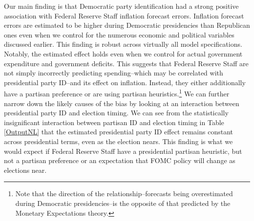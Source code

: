 \documentclass[a4paper]{article}\usepackage[]{graphicx}\usepackage[]{color}
\begin{document}
Our main finding is that Democratic party identification had a strong positive association with Federal Reserve Staff inflation forecast errors. Inflation forecast errors are estimated to be higher during Democratic presidencies than Republican ones even when we control for the numerous economic and political variables discussed earlier. This finding is robust across virtually all model specifications. Notably, the estimated effect holds even when we control for actual government expenditure and government deficits. This suggests that Federal Reserve Staff are not simply incorrectly predicting spending--which may be correlated with presidential party ID--and its effect on inflation. Instead, they either additionally have a partisan preference or are using partisan heuristics.\footnote{Note that the direction of the relationship--forecasts being overestimated during Democratic presidencies--is the opposite of that predicted by the Monetary Expectations theory.} We can further narrow down the likely causes of the bias by looking at an interaction between presidential party ID and election timing. We can see from the statistically insignificant interaction between partisan ID and election timing in Table \ref{OutputNL} that the estimated presidential party ID effect remains constant across presidential terms, even as the election nears. This finding is what we would expect if Federal Reserve Staff have a presidential partisan heuristic, but not a partisan preference or an expectation that FOMC policy will change as elections near.
\end{document}
